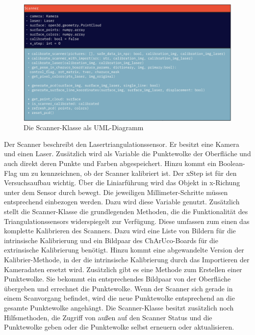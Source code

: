 		\begin{figure}[h]
			\centering
			\includegraphics[width=0.85\linewidth]{img/hauptteil/software/Scanner_UML.png}
			\caption{Die Scanner-Klasse als UML-Diagramm}
			\label{fig:scanner_uml}
		\end{figure}
		Der Scanner beschreibt den Lasertriangulationssensor. Er besitzt eine Kamera und einen Laser. Zusätzlich wird als Variable die Punktewolke der Oberfläche und auch direkt deren Punkte und Farben abgespeichert. Hinzu kommt ein Boolean-Flag um zu kennzeichnen, ob der Scanner kalibriert ist. Der xStep ist für den Versuchsaufbau wichtig. Über die Liniarführung wird das Objekt in x-Richung unter dem Sensor durch bewegt. Die jeweiligen Millimeter-Schritte müssen entsprechend einbezogen werden. Dazu wird diese Variable genutzt. \newline
		Zusätzlich stellt die Scanner-Klasse die grundlegenden Methoden, die die Funktionalität des Triangulationssensors widerspiegelt zur Verfügung. Diese umfassen zum einen das komplette Kalibrieren des Scanners. Dazu wird eine Liste von Bildern für die intrinsische Kalibrierung und ein Bildpaar des ChArUco-Boards für die extrinsische Kalibrierung benötigt. Hinzu kommt eine abgewandelte Version der Kalibrier-Methode, in der die intrinsische Kalibrierung durch das Importieren der Kameradaten ersetzt wird. Zusätzlich gibt es eine Methode zum Erstellen einer Punktewolke. Sie bekommt ein entsprechendes Bildpaar von der Oberfläche übergeben und errechnet die Punktewolke. Wenn der Scanner sich gerade in einem Scanvorgang befindet, wird die neue Punktewolke entsprechend an die gesamte Punktewolke angehängt. Die Scanner-Klasse besitzt zusätzlich noch Hilfsmethoden, die Zugriff von außen auf den Scanner Status und die Punktewolke geben oder die Punktewolke selbst erneuern oder aktualisieren.
		
